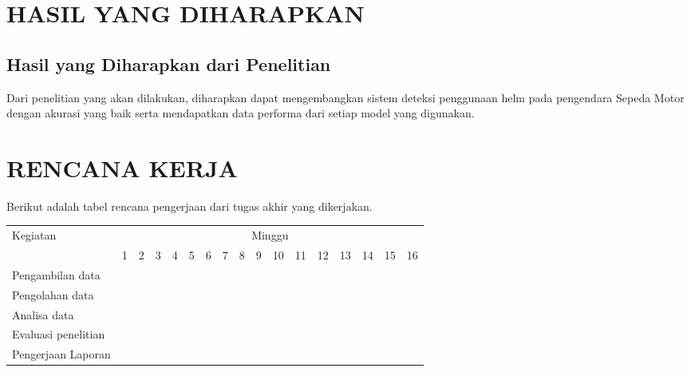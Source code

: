 \section{HASIL YANG DIHARAPKAN}

\subsection{Hasil yang Diharapkan dari Penelitian}

Dari penelitian yang akan dilakukan, diharapkan dapat mengembangkan sistem deteksi penggunaan
helm pada pengendara Sepeda Motor dengan akurasi yang baik serta mendapatkan data performa dari
setiap model yang digunakan.


\section{RENCANA KERJA}
Berikut adalah tabel rencana pengerjaan dari tugas akhir yang dikerjakan.
\newcommand{\w}{}
\newcommand{\G}{\cellcolor{gray}}
\begin{table}[h!]
  \begin{tabular}{|p{3.5cm}|c|c|c|c|c|c|c|c|c|c|c|c|c|c|c|c|}

    \hline
    \multirow{2}{*}{Kegiatan} & \multicolumn{16}{|c|}{Minggu} \\
    \cline{2-17} &
    1 & 2 & 3 & 4 & 5 & 6 & 7 & 8 & 9 & 10 & 11 & 12 & 13 & 14 & 15 & 16 \\
    \hline

    Pengambilan data &
    \G & \G & \G & \G & \w & \w & \w & \w & \w & \w & \w & \w & \w & \w & \w & \w \\
    \hline

    Pengolahan data &
    \w & \w & \w & \w & \G & \G & \G & \G & \w & \w & \w & \w & \w & \w & \w & \w \\
    \hline

    Analisa data &
    \w & \w & \w & \w & \w & \w & \w & \w & \G & \G & \G & \G & \w & \w & \w & \w \\
    \hline

    Evaluasi penelitian &
    \w & \w & \w & \w & \w & \w & \w & \w & \w & \w & \w & \w & \G & \G & \G & \G \\
    \hline

    Pengerjaan Laporan &
    \G & \G & \G & \G & \G & \G & \G & \G & \G & \G & \G & \G & \G & \G & \G & \G \\
    \hline

  \end{tabular}
\end{table}

